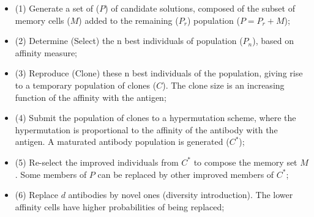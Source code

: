 \documentclass{article}
\begin{document}
\begin{itemize}
\item{(1) Generate a set of (\begin{math} P \end{math}) of candidate solutions, composed of the subset of memory cells  (\begin{math} M \end{math}) added to the remaining (\begin{math} P_r \end{math}) population (\begin{math} P = P_r + M \end{math});}
\item{(2) Determine (Select) the n best individuals of population (\begin{math} P_n \end{math}), based on affinity measure;}
\item{(3) Reproduce (Clone) these n best individuals of the population, giving rise to a temporary population of clones (\begin{math} C \end{math}). The clone size is an increasing function of the affinity with the antigen;}
\item{(4) Submit the population of clones to a hypermutation scheme, where the hypermutation is proportional to the affinity of the antibody with the antigen. A maturated antibody population is generated (\begin{math} C^* \end{math});}
\item{(5) Re-select the improved individuals from \begin{math} C^* \end{math} to compose the memory set \begin{math} M \end{math}. Some members of \begin{math} P \end{math} can be replaced by other improved members of \begin{math} C^* \end{math};}
\item{(6) Replace \begin{math} d \end{math} antibodies by novel ones (diversity introduction). The lower affinity cells have higher probabilities of being replaced;}

\end{itemize}
\end{document}
